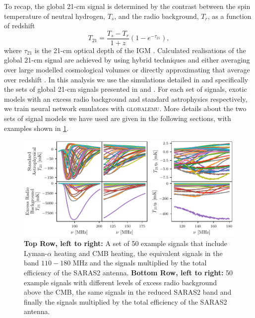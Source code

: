 To recap, the global 21-cm signal is determined by the contrast between the spin temperature of neutral hydrogen, $T_s$, and the radio background, $T_r$, as a function of redshift
\begin{equation}
    T_{21} = \frac{T_s -T_r}{1+z}(1 - e^{-\tau_{21}}),
    \label{eq:deltaT}
\end{equation}
where $\tau_{21}$ is the 21-cm optical depth of the IGM \citep{Mesinger2019}. Calculated realisations of the global 21-cm signal are achieved by using hybrid techniques and either averaging over large modelled cosmological volumes \citep[2D simulations e.g.][]{Mesinger2011} or directly approximating that average over redshift \citep[1D simulations e.g.][]{ARES_sim}. In this analysis we use the simulations detailed in \cite{Visbal_2012, Fialkov_rich_2014, Cohen_global_2017, Reis2020, Reis_sta_2021} and specifically the sets of global 21-cm signals presented in \cite{Reis2020} and \cite{Reis_sta_2021}. For each set of signals, exotic models with an excess radio background and standard astrophysics respectively, we train neural network emulators with \textsc{globalemu}. More details about the two sets of signal models we have used are given in the following sections, with examples shown in \cref{fig:signals}.

\begin{figure}
    \centering
    \includegraphics{saras2/figs/signals.pdf}
    \caption{\textbf{Top Row, left to right:} A set of 50 example signals that include Lyman-$\alpha$ heating and CMB heating, the equivalent signals in the band $110 - 180$ MHz and the signals multiplied by the total efficiency of the SARAS2 antenna. \textbf{Bottom Row, left to right:} 50 example signals with different levels of excess radio background above the CMB, the same signals in the reduced SARAS2 band and finally the signals multiplied by the total efficiency of the SARAS2 antenna.}
    \label{fig:signals}
\end{figure}

